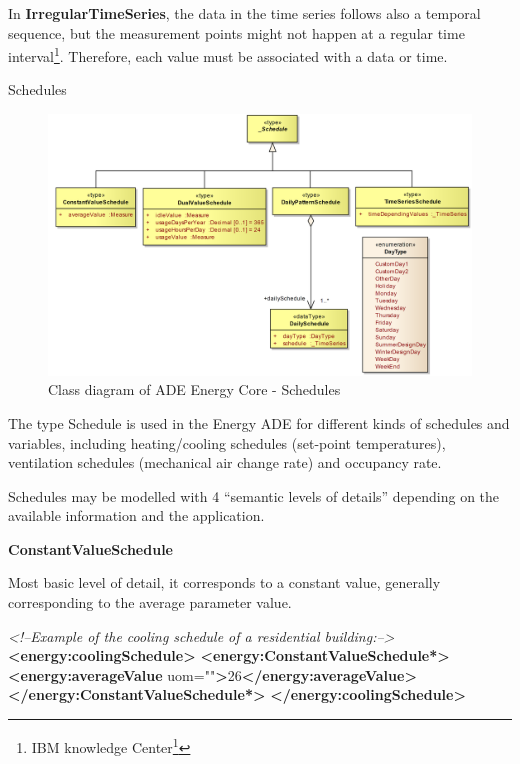 \documentclass[a4paper,12pt]{article}
\newenvironment{Shaded}{}{}
\newcommand{\KeywordTok}[1]{\textcolor[rgb]{0.00,0.44,0.13}{\textbf{{#1}}}}
\newcommand{\StringTok}[1]{\textcolor[rgb]{0.25,0.44,0.63}{{#1}}}
\newcommand{\CommentTok}[1]{\textcolor[rgb]{0.38,0.63,0.69}{\textit{{#1}}}}
\newcommand{\OtherTok}[1]{\textcolor[rgb]{0.00,0.44,0.13}{{#1}}}
\newcommand{\ErrorTok}[1]{\textcolor[rgb]{1.00,0.00,0.00}{\textbf{{#1}}}}
\newcommand{\NormalTok}[1]{{#1}}
\renewcommand{\href}[2]{#2\footnote{\url{#1}}}
\begin{document}
In \textbf{IrregularTimeSeries}, the data in the time series follows
also a temporal sequence, but the measurement points might not happen at
a regular time interval\footnote{\href{http://www-01.ibm.com/support/knowledgecenter/SSCRJU_3.0.0/com.ibm.swg.im.infosphere.streams.timeseries-toolkit.doc/doc/timeseries-regular.html}{IBM
  knowledge Center}}. Therefore, each value must be associated with a
data or time.

Schedules

\begin{figure}[htbp]
\centering
\includegraphics{fig/class_schedules.png}
\caption{Class diagram of ADE Energy Core - Schedules}
\end{figure}

The type Schedule is used in the Energy ADE for different kinds of
schedules and variables, including heating/cooling schedules (set-point
temperatures), ventilation schedules (mechanical air change rate) and
occupancy rate.

Schedules may be modelled with 4 ``semantic levels of details''
depending on the available information and the application.

\textbf{ConstantValueSchedule}

Most basic level of detail, it corresponds to a constant value,
generally corresponding to the average parameter value.

\begin{Shaded}
\begin{Highlighting}[]
\CommentTok{<!--Example of the cooling schedule of a residential building:-->}
\KeywordTok{<energy:coolingSchedule>}
    \KeywordTok{<energy:ConstantValueSchedule}\ErrorTok{*}\KeywordTok{>}
        \KeywordTok{<energy:averageValue}\OtherTok{ uom=}\StringTok{""}\KeywordTok{>}\NormalTok{26}\KeywordTok{</energy:averageValue>}
    \KeywordTok{</energy:ConstantValueSchedule}\ErrorTok{*}\KeywordTok{>}
\KeywordTok{</energy:coolingSchedule>}
\end{Highlighting}
\end{Shaded}
\end{document}
